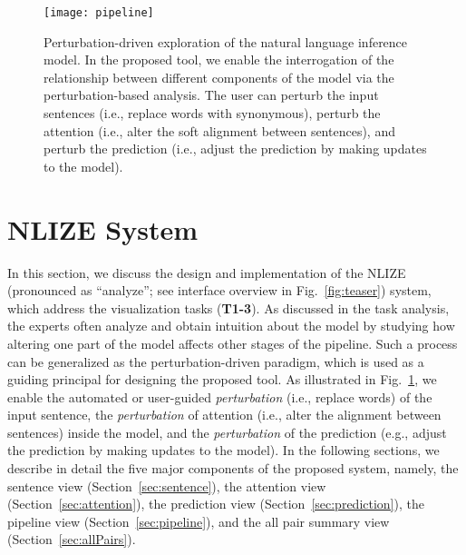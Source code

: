 \begin{figure}[htbp]
\centering
 \texttt{[image: pipeline]}
 \caption{
 Perturbation-driven exploration of the natural language inference model.
 In the proposed tool, we enable the interrogation of the relationship between different components of the model via the perturbation-based analysis.
 The user can perturb the input sentences (i.e., replace words with synonymous), perturb the attention (i.e., alter the soft alignment between sentences), and perturb the prediction (i.e., adjust the prediction by making updates to the model).
}
\label{fig:modelPipeline}
\end{figure}

\section{NLIZE System}
In this section, we discuss the design and implementation of the NLIZE (pronounced as ``analyze''; see interface overview in Fig.~\ref{fig:teaser}) system, which address the visualization tasks (\textbf{T1-3}).
%
As discussed in the task analysis, the experts often analyze and obtain intuition about the model by studying how altering one part of the model affects other stages of the pipeline.
%
Such a process can be generalized as the perturbation-driven paradigm, which is used as a guiding principal for designing the proposed tool.
%
As illustrated in Fig.~\ref{fig:modelPipeline}, we enable the automated or user-guided \emph{perturbation} (i.e., replace words) of the input sentence, the \emph{perturbation} of attention (i.e., alter the alignment between sentences) inside the model, and the \emph{perturbation} of the prediction (e.g., adjust the prediction by making updates to the model).
%
In the following sections, we describe in detail the five major components of the proposed system, namely, the sentence view  (Section~\ref{sec:sentence}), the attention view (Section~\ref{sec:attention}), the prediction view (Section~\ref{sec:prediction}), the pipeline view (Section~\ref{sec:pipeline}), and the all pair summary view (Section~\ref{sec:allPairs}).




%

